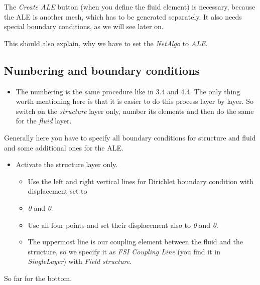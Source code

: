 The \emph{Create ALE} button (when you define the fluid element) is
necessary, because the ALE is another mesh, which has to be generated
separately. It also needs special boundary conditions, as we will
see later on.

This should also explain, why we have to set the \emph{NetAlgo} to
\emph{ALE}.


\subsection{Numbering and boundary conditions}

\begin{itemize}
\item The numbering is the same procedure like in 3.4 and 4.4. The only
thing worth mentioning here is that it is easier to do this process
layer by layer. So switch on the \emph{structure} layer only, number
its elements and then do the same for the \emph{fluid} layer.
\end{itemize}
Generally here you have to specify all boundary conditions for structure and fluid
and some additional ones for the ALE.

\begin{itemize}
\item Activate the structure layer only. 

\begin{itemize}
\item Use the left and right vertical lines for Dirichlet boundary condition with displacement
set to 
\item \emph{0} and \emph{0}. 
\item Use all four points and set their displacement also to \emph{0} and
\emph{0}.
\item The uppermost line is our coupling element between the fluid and the
structure, so we specify it as \emph{FSI Coupling Line} (you find
it in \emph{SingleLayer}) with \emph{Field structure}.
\end{itemize}
\end{itemize}
So far for the bottom.

